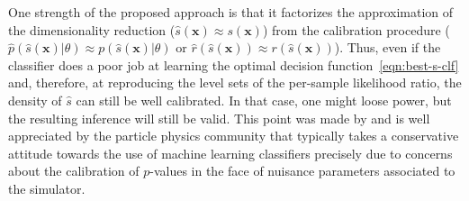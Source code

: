 \documentclass[12pt]{article}
\numberwithin{equation}{section}
\theoremstyle{plain}
\begin{document}



One strength of the proposed approach is that it factorizes the approximation of
the dimensionality reduction ($\hat{s}(\mathbf{x}) \approx s(\mathbf{x})$) from the
calibration procedure ($\hat p(\hat s(\mathbf{x})| \theta) \approx
p(\hat{s}(\mathbf{x})|\theta)$ or $\hat{r}(\hat{s}(\mathbf{x})) \approx r(\hat{s}(\mathbf{x}))$). Thus, even if the classifier does a poor job at
learning the optimal decision function~\ref{eqn:best-s-clf} and, therefore, at
reproducing the level sets of the per-sample likelihood ratio, the density of
$\hat{s}$ can still be well calibrated. In that case, one might loose power, but
the resulting inference will still be valid. This point was made by
\cite{Neal:2007zz} and is well appreciated by the particle physics community
that typically takes a conservative attitude towards the use of machine learning
classifiers precisely due to concerns about the calibration of $p$-values in the
face of nuisance parameters associated to the simulator.
\end{document}
